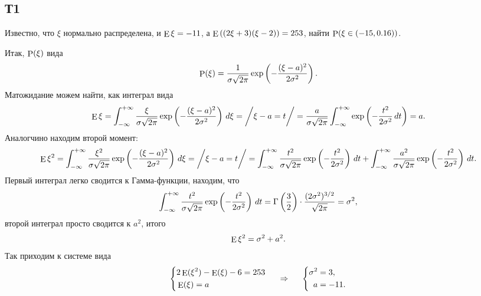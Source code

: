 \subsection*{Т1}


Известно, что $\xi$ нормально распределена, и $\E \xi = -11$, а $\E\left(
    (2 \xi+3)(\xi-2)
\right) = 253$, найти $\P(\xi \in (-15, 0.16))$.

Итак, $\P(\xi)$ вида
\begin{equation*}
    \P(\xi) = \frac{1}{\sigma \sqrt{2\pi}} \exp\left(
        - \frac{(\xi-a)^2}{2 \sigma^2}
    \right).
\end{equation*}
Матожидание можем найти, как интеграл вида
\begin{equation*}
    \E \xi = \int_{-\infty}^{+\infty} \frac{\xi}{\sigma \sqrt{2\pi}} \exp\left(
        - \frac{(\xi-a)^2}{2\sigma^2}
    \right) \d \xi = \bigg/
        \xi - a = t
    \bigg/ = \frac{a}{\sigma \sqrt{2\pi}} \int_{-\infty}^{+\infty} \exp\left(
        - \frac{t^2}{2 \sigma^2} \d t
    \right) = a.
\end{equation*}
Аналогчино находим второй момент:
\begin{equation*}
    \E \xi^2 = \int_{-\infty}^{+\infty} \frac{\xi^2}{\sigma \sqrt{2\pi}}
    \exp\left(
        - \frac{(\xi-a)^2}{2\sigma^2}
    \right) \d \xi = \bigg/
        \xi - a = t
    \bigg/ = \int_{-\infty}^{+\infty}  \frac{t^2}{\sigma \sqrt{2\pi}} \exp\left(
        - \frac{t^2}{2 \sigma^2}
    \right) \d t + 
    \int_{-\infty}^{+\infty} 
    \frac{a^2}{\sigma \sqrt{2\pi}} \exp\left(
        - \frac{t^2}{2 \sigma^2}
    \right)
    \d t.
\end{equation*}
Первый интеграл легко сводится к Гамма-функции, находим, что
\begin{equation*}
    \int_{-\infty}^{+\infty}  \frac{t^2}{\sigma \sqrt{2\pi}} \exp\left(
        - \frac{t^2}{2 \sigma^2}
    \right) \d t = \Gamma\left(\frac{3}{2}\right) \cdot \frac{(2\sigma^2)^{3/2}}{\sqrt{2\pi}} = \sigma^2,
\end{equation*}
второй интеграл просто сводится к $a^2$, итого
\begin{equation*}
    \E \xi^2 = \sigma^2 + a^2.
\end{equation*}
Так приходим к системе вида
\begin{equation*}
    \left\{\begin{aligned}
        &2 \E(\xi^2) - \E(\xi) - 6 = 253 \\
        &\E(\xi) = a
    \end{aligned}\right.
    \hspace{0.5cm} \Rightarrow \hspace{0.5cm}
    \left\{\begin{aligned}
        \sigma^2 &= 3, \\
        a & = -11.
    \end{aligned}\right.
\end{equation*}
